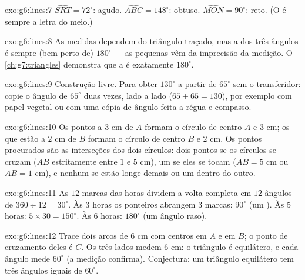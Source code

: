 \begin{solution}{exo:g6:lines:7}
$\widehat{SRT} = 72^\circ$: agudo. \quad
$\widehat{ABC} = 148^\circ$: obtuso. \quad
$\widehat{MON} = 90^\circ$: reto. (O  é sempre a letra do
meio.)
\end{solution}

\begin{solution}{exo:g6:lines:8}
As medidas dependem do triângulo traçado, mas a  dos três ângulos é
sempre (bem perto de) $180^\circ$ --- as pequenas  vêm da
imprecisão da medição. O \cref{ch:g7:triangles} demonstra que a  é
exatamente $180^\circ$.
\end{solution}

\begin{solution}{exo:g6:lines:9}
Construção livre. Para obter $130^\circ$ a partir de $65^\circ$ sem o
transferidor: copie o ângulo de $65^\circ$ duas vezes, lado a lado
($65 + 65 = 130$), por exemplo com papel vegetal ou com uma cópia de
ângulo feita a régua e compasso.
\end{solution}

\begin{solution}{exo:g6:lines:10}
Os pontos a $3$ cm de $A$ formam o círculo de centro $A$ e  $3$ cm;
os que estão a $2$ cm de $B$ formam o círculo de centro $B$ e 
$2$ cm. Os pontos procurados são as interseções dos dois círculos: dois
pontos se os círculos se cruzam ($AB$ estritamente entre $1$ e $5$ cm),
um se eles se tocam ($AB = 5$ cm ou $AB = 1$ cm), e nenhum se estão
longe demais ou um dentro do outro.
\end{solution}

\begin{solution}{exo:g6:lines:11}
As $12$ marcas das horas dividem a volta completa em $12$ ângulos de
$360 \div 12 = 30^\circ$. Às 3 horas os ponteiros abrangem $3$ marcas:
$90^\circ$ (um ). Às 5 horas: $5 \times 30 = 150^\circ$. Às
6 horas: $180^\circ$ (um ângulo raso).
\end{solution}

\begin{solution}{exo:g6:lines:12}
Trace dois arcos de  $6$ cm com centros em $A$ e em $B$; o ponto de
cruzamento deles é $C$. Os três lados medem $6$ cm: o triângulo é
equilátero, e cada ângulo mede $60^\circ$ (a medição confirma).
Conjectura: um triângulo equilátero tem três ângulos iguais de
$60^\circ$.
\end{solution}

